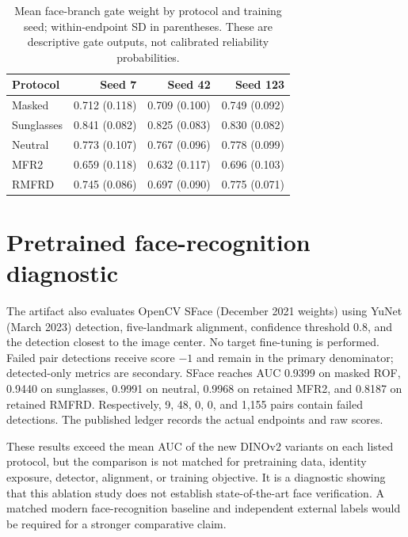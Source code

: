 \documentclass[12pt,a4paper,oneside]{report}
\begin{document}
\begin{table}[t]
\centering
\caption{Mean face-branch gate weight by protocol and training seed; within-endpoint SD in parentheses. These are descriptive gate outputs, not calibrated reliability probabilities.}
\label{tab:gatedistribution}
\begin{tabular}{lrrr}
\toprule
Protocol & Seed 7 & Seed 42 & Seed 123\\
\midrule
Masked & 0.712 (0.118) & 0.709 (0.100) & 0.749 (0.092)\\
Sunglasses & 0.841 (0.082) & 0.825 (0.083) & 0.830 (0.082)\\
Neutral & 0.773 (0.107) & 0.767 (0.096) & 0.778 (0.099)\\
MFR2 & 0.659 (0.118) & 0.632 (0.117) & 0.696 (0.103)\\
RMFRD & 0.745 (0.086) & 0.697 (0.090) & 0.775 (0.071)\\
\bottomrule
\end{tabular}
\end{table}
\section{Pretrained face-recognition diagnostic}
The artifact also evaluates OpenCV SFace \cite{sface} (December 2021 weights) using YuNet \cite{yunet} (March 2023) detection, five-landmark alignment, confidence threshold 0.8, and the detection closest to the image center. No target fine-tuning is performed. Failed pair detections receive score $-1$ and remain in the primary denominator; detected-only metrics are secondary. SFace reaches AUC 0.9399 on masked ROF, 0.9440 on sunglasses, 0.9991 on neutral, 0.9968 on retained MFR2, and 0.8187 on retained RMFRD. Respectively, 9, 48, 0, 0, and 1,155 pairs contain failed detections. The published ledger records the actual endpoints and raw scores.

These results exceed the mean AUC of the new DINOv2 variants on each listed protocol, but the comparison is not matched for pretraining data, identity exposure, detector, alignment, or training objective. It is a diagnostic showing that this ablation study does not establish state-of-the-art face verification. A matched modern face-recognition baseline and independent external labels would be required for a stronger comparative claim.
\end{document}
